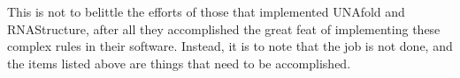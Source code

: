 This is not to belittle the efforts of those that implemented UNAfold
and RNAStructure, after all they accomplished the great feat of
implementing these complex rules in their software. Instead, it is to note
that the job is not done, and the items listed above are things that
need to be accomplished.





